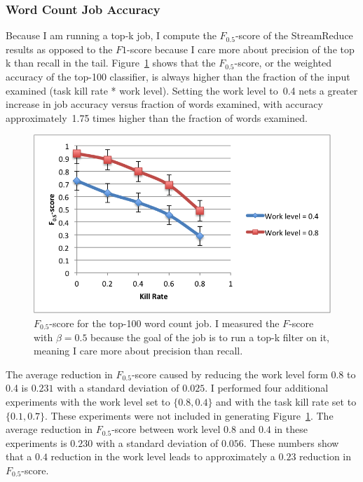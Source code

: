 \documentclass[12pt,twocolumn]{article}
\begin{document}
\subsubsection{Word Count Job Accuracy}
Because I am running a top-k job, I compute the $F_{0.5}$-score of the StreamReduce
results as
opposed to the $F1$-score because I care more about precision of the top k than recall
in the tail. Figure~\ref{fig:fscore} shows that the $F_{0.5}$-score, or the weighted
accuracy of the top-100 classifier, is always higher than the fraction of the input
examined (task kill rate * work level). Setting the work level to~0.4 nets a greater increase
in job accuracy versus fraction of words examined, with accuracy approximately~1.75 times
higher than the fraction of words examined.

\begin{figure}
\includegraphics[width=\linewidth]{f-score.png}
\caption{$F_{0.5}$-score for the top-100 word count job. I measured the $F$-score with
$\beta=0.5$ because the goal of the job is to run a top-k filter on it, meaning I care more
about precision than recall.}
\label{fig:fscore}
\end{figure}

The average reduction in $F_{0.5}$-score caused by reducing the work level form 0.8 to 0.4
is
$0.231$ with a standard deviation of $0.025$. I performed four additional experiments with
the
work level set to $\{0.8,0.4\}$ and with the task kill rate set to $\{0.1,0.7\}$. These
experiments were
not included in generating Figure~\ref{fig:fscore}. The average reduction in $F_{0.5}$-score
between
work level $0.8$ and $0.4$ in these experiments is $0.230$ with a standard deviation of
$0.056$. These numbers show that a $0.4$ reduction in the work level leads to
approximately a
$0.23$ reduction in $F_{0.5}$-score.
\end{document}
